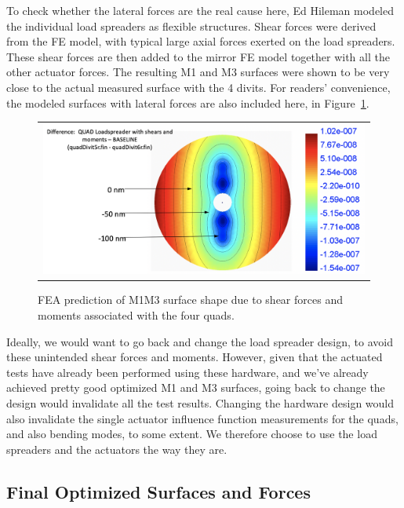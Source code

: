 \documentclass [twoside,openbib,12pt]{article}
\begin{document}
To check whether the lateral forces are the real cause here, Ed
Hileman modeled the individual load spreaders as flexible structures.
Shear forces were derived from the FE model, with typical large axial forces
exerted on the load spreaders. These shear forces are then added to the
mirror FE model together with all the other actuator forces. The
resulting M1 and M3 surfaces were shown to be very close to the actual
measured surface with the 4 divits.
For readers' convenience, the modeled surfaces with lateral forces are
also included here, in Figure~\ref{fig:divitsFEA}.


 \begin{figure}[bthp]
   \begin{center}
     \begin{tabular}{c}
\includegraphics[width=140mm]{figures/divitsFEA.png}
  \end{tabular}
   \end{center}
   \caption
   { \label{fig:divitsFEA}
     FEA prediction of M1M3 surface shape due to shear forces and
     moments associated with the four quads.
 }
\end{figure}

Ideally, we would want to go back and change the load spreader design,
to avoid these unintended shear forces and moments.
However, given that the actuated tests have already been performed
using these hardware, and we've already achieved pretty good optimized
M1 and M3 surfaces, going back to change the design would invalidate
all the test results.
Changing the hardware design would also invalidate the single actuator
influence function measurements for the quads, and also bending modes,
to some extent.
We therefore choose to use the load spreaders and the actuators the
way they are.

 \subsection{Final Optimized Surfaces and Forces}
 \label{sec:optS}
\end{document}
